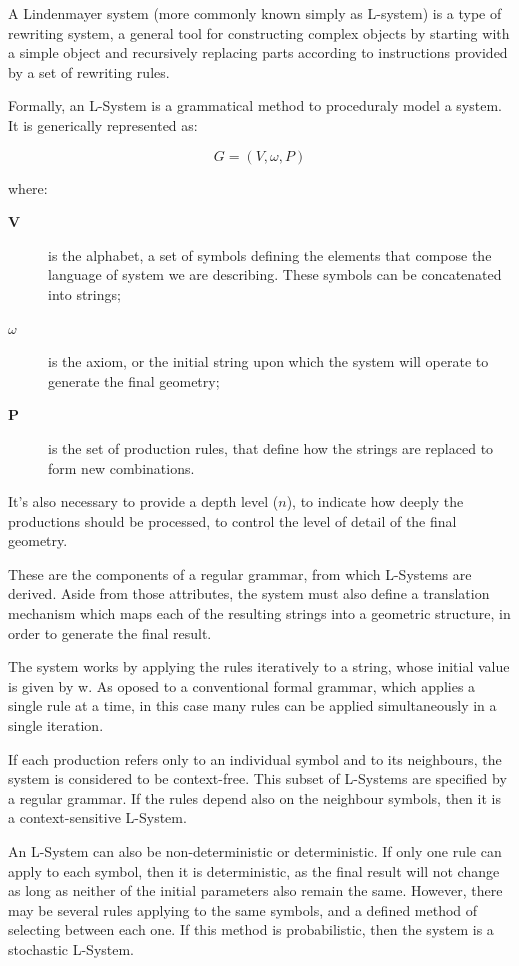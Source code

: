 \documentclass{acmtog}
\begin{document}
A Lindenmayer system (more commonly known simply as L-system) is a type of rewriting system, a general tool for constructing complex objects by starting with a simple object and recursively replacing parts according to instructions provided by a set of rewriting rules.

Formally, an L-System is a grammatical method to proceduraly model a system. It is generically represented as:

\begin{equation}
  G = (V, \omega , P)
  \label{eq:genericsystem}
\end{equation}

where:
\begin{description}
  \item[\textbf{V}] is the alphabet, a set of symbols defining the elements that compose the language of system we are describing. These symbols can be concatenated into strings;
  \item[\textbf{$\omega$}] is the axiom, or the initial string upon which the system will operate to generate the final geometry;
  \item[\textbf{P}] is the set of production rules, that define how the strings are replaced to form new combinations.
\end{description}

It's also necessary to provide a depth level ($n$), to indicate how deeply the productions should be processed, to control the level of detail of the final geometry.

These are the components of a regular grammar, from which L-Systems are derived. Aside from those attributes, the system must also define a translation mechanism which maps each of the resulting strings into a geometric structure, in order to generate the final result.

The system works by applying the rules iteratively to a string, whose initial value is given by w. As oposed to a conventional formal grammar, which applies a single rule at a time, in this case many rules can be applied simultaneously in a single iteration.

If each production refers only to an individual symbol and to its neighbours, the system is considered to be context-free. This subset of L-Systems are specified by a regular grammar. If the rules depend also on the neighbour symbols, then it is a context-sensitive L-System.

An L-System can also be non-deterministic or deterministic. If only one rule can apply to each symbol, then it is deterministic, as the final result will not change as long as neither of the initial parameters also remain the same. However, there may be several rules applying to the same symbols, and a defined method of selecting between each one. If this method is probabilistic, then the system is a stochastic L-System.
\end{document}
